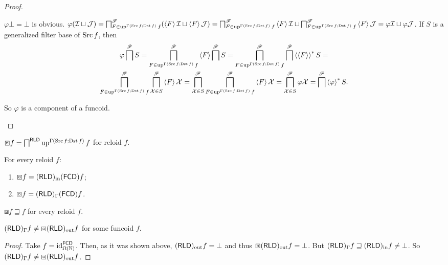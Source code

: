 \begin{proof}
\begin{widedisorder}
$\varphi\bot=\bot$ is obvious. $\varphi(\mathcal{I}\sqcup\mathcal{J})=\bigsqcap_{F\in\operatorname{up}^{\Gamma(\operatorname{Src} f;\operatorname{Dst} f)}f}^{\mathscr{F}}(\left\langle F\right\rangle\mathcal{I}\sqcup\left\langle F\right\rangle\mathcal{J})=\bigsqcap_{F\in\operatorname{up}^{\Gamma(\operatorname{Src} f;\operatorname{Dst} f)}f}^{\mathscr{F}}\left\langle F\right\rangle\mathcal{I}\sqcup\bigsqcap_{F\in\operatorname{up}^{\Gamma(\operatorname{Src} f;\operatorname{Dst} f)}f}^{\mathscr{F}}\left\langle F\right\rangle\mathcal{J}=\varphi\mathcal{I}\sqcup\varphi\mathcal{J}$.
If $S$ is a generalized filter base of $\operatorname{Src} f$, then 
\begin{multline*}
\varphi\bigsqcap^{\mathscr{F}}S=\bigsqcap_{F\in\operatorname{up}^{\Gamma(\operatorname{Src} f;\operatorname{Dst} f)}f}^{\mathscr{F}}\left\langle F\right\rangle\bigsqcap^{\mathscr{F}}S=\bigsqcap_{F\in\operatorname{up}^{\Gamma(\operatorname{Src} f;\operatorname{Dst} f)}f}^{\mathscr{F}}\bigsqcap^{\mathscr{F}}\left\langle \left\langle F\right\rangle\right\rangle ^{\ast}S=\\
\bigsqcap_{F\in\operatorname{up}^{\Gamma(\operatorname{Src} f;\operatorname{Dst} f)}f}^{\mathscr{F}}\bigsqcap_{\mathcal{X}\in S}^{\mathscr{F}}\left\langle F\right\rangle\mathcal{X}=\bigsqcap_{\mathcal{X}\in S}^{\mathscr{F}}\bigsqcap_{F\in\operatorname{up}^{\Gamma(\operatorname{Src} f;\operatorname{Dst} f)}f}^{\mathscr{F}}\left\langle F\right\rangle\mathcal{X}=\bigsqcap_{\mathcal{X}\in S}^{\mathscr{F}}\varphi\mathcal{X}=\bigsqcap^{\mathscr{F}}\left\langle \varphi\right\rangle ^{\ast}S.
\end{multline*}



So $\varphi$ is a component of a funcoid.

\end{widedisorder}
\end{proof}
\begin{defn}
$\boxbox f=\bigsqcap^{\mathsf{RLD}}\operatorname{up}^{\Gamma(\operatorname{Src} f;\operatorname{Dst} f)}f$
for reloid $f$.\end{defn}
\begin{conjecture}
For every reloid $f$:
\begin{enumerate}
\item $\boxbox f=(\mathsf{RLD})_{\mathrm{in}}(\mathsf{FCD}) f$;
\item $\boxbox f=(\mathsf{RLD})_{\Gamma}(\mathsf{FCD}) f$.
\end{enumerate}
\end{conjecture}
\begin{obvious}
$\boxbox f\sqsupseteq f$ for every reloid $f$.\end{obvious}
\begin{example}
$(\mathsf{RLD})_{\Gamma}f\neq\boxbox(\mathsf{RLD})_{\mathrm{out}} f$ for some funcoid
$f$.\end{example}
\begin{proof}
Take $f=\operatorname{id}_{\Omega(\mathbb{N})}^{\mathsf{FCD}}$. Then, as it was
shown above, $(\mathsf{RLD})_{\mathrm{out}} f=\bot$ and thus $\boxbox(\mathsf{RLD})_{\mathrm{out}} f=\bot$.
But $(\mathsf{RLD})_{\Gamma}f\sqsupseteq(\mathsf{RLD})_{\mathrm{in}} f\neq\bot$. So $(\mathsf{RLD})_{\Gamma}f\neq\boxbox(\mathsf{RLD})_{\mathrm{out}} f$.\end{proof}
